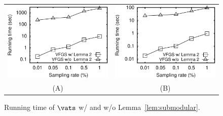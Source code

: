 

\begin{figure}
 \centering
 \small
 \begin{tabular}{cc}
   \includegraphics[width=0.44\columnwidth]{pictures/tporto}
   &
   \includegraphics[width=0.44\columnwidth]{pictures/tshenzhen}
   \\
   (A) \pt{}
   &
   (B) \sz{}	
 \end{tabular}
 \vspace{-3mm}
 \caption{Running time of $\vats$ w/ and w/o Lemma~\ref{lem:submodular}.}
 \label{fig:cost}
 \vspace{-3mm}
\end{figure}


